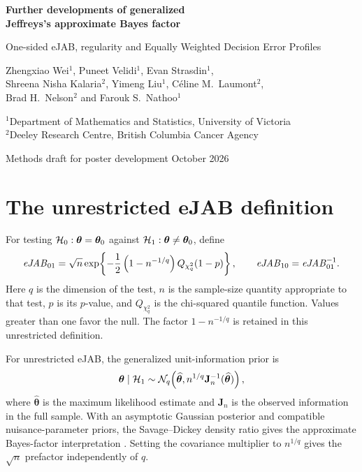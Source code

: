 \documentclass[11pt,letterpaper]{article}
\begin{document}
\begin{center}
{\LARGE\bfseries Further developments of generalized\\
Jeffreys's approximate Bayes factor\par}
\vspace{5pt}
{\large One-sided eJAB, regularity and Equally Weighted Decision Error Profiles\par}
\vspace{12pt}
Zhengxiao Wei$^1$, Puneet Velidi$^1$, Evan Strasdin$^1$,\\
Shreena Nisha Kalaria$^2$, Yimeng Liu$^1$, C\'eline M.~Laumont$^2$,\\
Brad H.~Nelson$^2$ and Farouk S.~Nathoo$^1$
\vspace{6pt}

{\small $^1$Department of Mathematics and Statistics, University of Victoria\\
$^2$Deeley Research Centre, British Columbia Cancer Agency}
\vspace{8pt}

{\small Methods draft for poster development  October 2026}
\end{center}

\begin{abstract}

\end{abstract}
\nocite{velidi2025generalized}

\section{The unrestricted eJAB definition}
For testing \(\mathcal H_0:\boldsymbol\theta=\boldsymbol\theta_0\) against
\(\mathcal H_1:\boldsymbol\theta\ne\boldsymbol\theta_0\), define
\begin{equation}
  \mathit{eJAB}_{01}=\sqrt n\exp\!\left\{-\frac12 \left(1-n^{-1/q}\right)Q_{\chi_q^2}(1-p)\right\},
  \qquad \mathit{eJAB}_{10}=\mathit{eJAB}_{01}^{-1}.
  \label{eq:two-sided}
\end{equation}
Here \(q\) is the dimension of the test, \(n\) is the sample-size quantity
appropriate to that test, \(p\) is its \(p\)-value, and \(Q_{\chi_q^2}\) is
the chi-squared quantile function. Values greater than one favor the null.
The factor \(1-n^{-1/q}\) is retained in this unrestricted definition.

For unrestricted eJAB, the generalized unit-information prior is
\begin{equation}
 \boldsymbol\theta\mid\mathcal H_1\sim
 \mathcal N_q\!\left(\widehat{\boldsymbol\theta},
 n^{1/q}\mathbf J_n^{-1}(\widehat{\boldsymbol\theta})\right),
 \label{eq:general-prior}
\end{equation}
where \(\widehat{\boldsymbol\theta}\) is the maximum likelihood estimate and
\(\mathbf J_n\) is the observed information in the full sample.
With an asymptotic Gaussian posterior and compatible nuisance-parameter
priors, the Savage--Dickey density ratio gives the approximate Bayes-factor
interpretation \citep{mulder2022generalization}. Setting the covariance
multiplier to \(n^{1/q}\) gives the \(\sqrt n\) prefactor independently of
\(q\).
\end{document}
